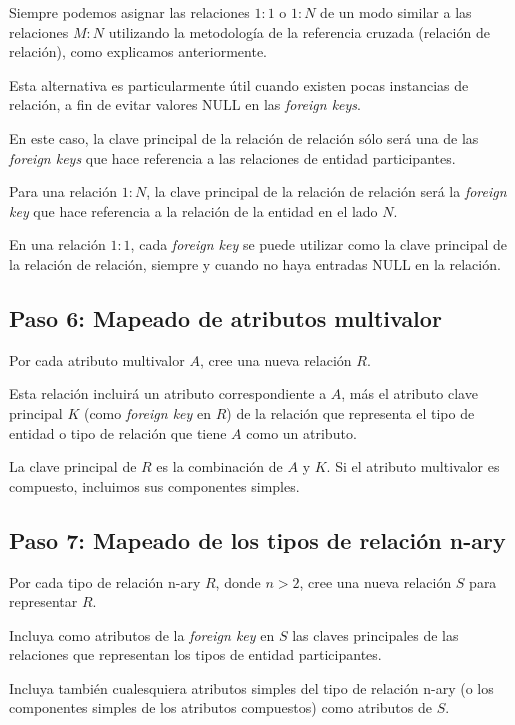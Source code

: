 Siempre podemos asignar las relaciones $1:1$ o $1:N$ de un modo similar a las relaciones $M:N$ utilizando la metodología de la referencia cruzada (relación de relación), como explicamos anteriormente. 


Esta alternativa es particularmente útil cuando existen pocas instancias de relación, a fin de evitar valores NULL en las \textit{foreign keys}.


En este caso, la clave principal de la relación de relación sólo será una de las \textit{foreign keys} que hace referencia a las relaciones de entidad participantes. 


Para una relación $1:N$, la clave principal de la relación de relación será la \textit{foreign key} que hace referencia a la relación de la entidad en el lado $N$.


En una relación $1:1$, cada \textit{foreign key} se puede utilizar como la clave principal de la relación de relación, siempre y cuando no haya entradas NULL en la relación.




\subsection*{Paso 6: Mapeado de atributos multivalor}

Por cada atributo multivalor $A$, cree una nueva relación $R$.


Esta relación incluirá un atributo correspondiente a $A$, más el atributo clave principal $K$ (como \textit{foreign key} en $R$) de la relación que representa el tipo de entidad o tipo de relación que tiene $A$ como un atributo.


La clave principal de $R$ es la combinación de $A$ y $K$. Si el atributo multivalor es compuesto, incluimos sus componentes simples.


\subsection*{Paso 7: Mapeado de los tipos de relación n-ary}
Por cada tipo de relación n-ary $R$, donde $n > 2$, cree una nueva relación $S$ para representar $R$.


Incluya como atributos de la \textit{foreign key} en $S$ las claves principales de las relaciones que representan los tipos de entidad participantes. 


Incluya también cualesquiera atributos simples del tipo de relación n-ary (o los componentes simples de los atributos compuestos) como atributos de $S$.


